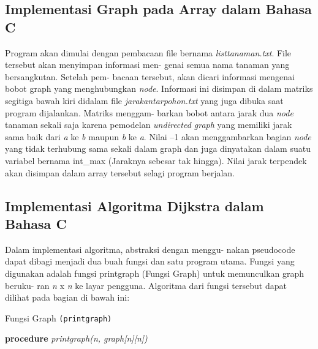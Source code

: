 \documentclass[conference]{IEEEtran}
\begin{document}
\subsection{Implementasi Graph pada Array dalam Bahasa C}
    Program  akan  dimulai  dengan  pembacaan  file  bernama
    \emph{listtanaman.txt}. File tersebut akan menyimpan informasi men-
    genai semua nama tanaman yang bersangkutan. Setelah pem-
    bacaan tersebut, akan dicari informasi mengenai bobot graph
    yang menghubungkan \emph{node}. Informasi ini disimpan di dalam
    matriks  segitiga  bawah  kiri  didalam  file \emph{jarakantarpohon.txt}
    yang juga dibuka saat program dijalankan. Matriks menggam-
    barkan bobot antara jarak dua \emph{node} tanaman sekali saja karena
    pemodelan \emph{undirected graph} yang  memiliki jarak  sama  baik
    dari \emph{a} ke \emph{b} maupun \emph{b} ke \emph{a}.  Nilai --1 akan menggambarkan
    bagian \emph{node} yang  tidak  terhubung  sama  sekali  dalam  graph
    dan  juga  dinyatakan  dalam  suatu  variabel  bernama  int\_max
    (Jaraknya  sebesar  tak  hingga).  Nilai  jarak  terpendek  akan
    disimpan dalam array tersebut selagi program berjalan.

\subsection{Implementasi Algoritma Dijkstra dalam Bahasa C}
    Dalam  implementasi  algoritma,  abstraksi  dengan  menggu-
    nakan pseudocode dapat dibagi menjadi dua buah fungsi dan
    satu  program  utama.  Fungsi  yang  digunakan  adalah  fungsi
    printgraph (Fungsi Graph) untuk memunculkan graph beruku-
    ran \emph{n} x \emph{n} ke  layar  pengguna.  Algoritma  dari  fungsi  tersebut
    dapat dilihat pada bagian di bawah ini:\par

    \begin{algorithm}
        \SetAlgoLined
        \DontPrintSemicolon
        \caption{Fungsi Graph \texttt{(printgraph)}}
        \textbf{procedure} \emph{printgraph(n, graph[n][n])}\\
    \end{algorithm}
\end{document}
